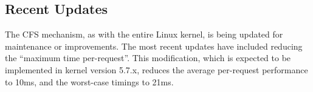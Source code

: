 \subsection{Recent Updates}

The CFS mechanism, as with the entire Linux kernel, is being updated for
maintenance or improvements. The most recent updates have included reducing the
``maximum time per-request''. This modification, which is expected to be
implemented in kernel version 5.7.x, reduces the average per-request performance
to 10ms, and the worst-case timings to 21ms\cite{larabel_2020}.

